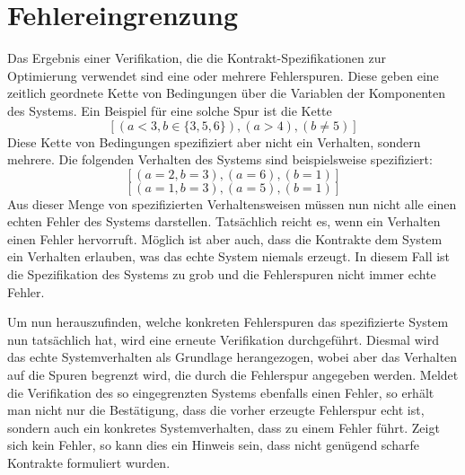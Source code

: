 \section{Fehlereingrenzung}
Das Ergebnis einer Verifikation, die die Kontrakt-Spezifikationen zur Optimierung verwendet sind eine oder mehrere Fehlerspuren.
Diese geben eine zeitlich geordnete Kette von Bedingungen über die Variablen der Komponenten des Systems.
Ein Beispiel für eine solche Spur ist die Kette
\[ \left[ (a<3,b\in \{3,5,6\}), (a > 4), (b\neq 5) \right] \]
Diese Kette von Bedingungen spezifiziert aber nicht ein Verhalten, sondern mehrere.
Die folgenden Verhalten des Systems sind beispielsweise spezifiziert:
\[ \left[ (a=2,b=3), (a=6), (b = 1) \right] \]
\[ \left[ (a=1,b=3), (a=5), (b = 1) \right] \]
Aus dieser Menge von spezifizierten Verhaltensweisen müssen nun nicht alle einen echten Fehler des Systems darstellen.
Tatsächlich reicht es, wenn ein Verhalten einen Fehler hervorruft.
Möglich ist aber auch, dass die Kontrakte dem System ein Verhalten erlauben, was das echte System niemals erzeugt.
In diesem Fall ist die Spezifikation des Systems zu grob und die Fehlerspuren nicht immer echte Fehler.

Um nun herauszufinden, welche konkreten Fehlerspuren das spezifizierte System nun tatsächlich hat, wird eine erneute Verifikation durchgeführt.
Diesmal wird das echte Systemverhalten als Grundlage herangezogen, wobei aber das Verhalten auf die Spuren begrenzt wird, die durch die Fehlerspur angegeben werden.
Meldet die Verifikation des so eingegrenzten Systems ebenfalls einen Fehler, so erhält man nicht nur die Bestätigung, dass die vorher erzeugte Fehlerspur echt ist, sondern auch ein konkretes Systemverhalten, dass zu einem Fehler führt.
Zeigt sich kein Fehler, so kann dies ein Hinweis sein, dass nicht genügend scharfe Kontrakte formuliert wurden.

